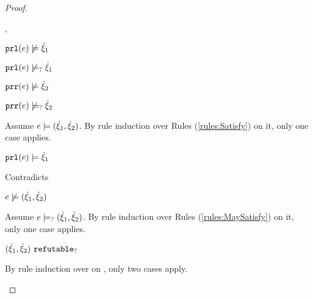 \begin{proof}
\begin{byCases}
\begin{byCases}
\begin{byCases}
        \item[\cnotsatisfyormay{\hprl{e}}{\hxi_1},\cnotsatisfyormay{\hprr{e}}{\hxi_2}]
            \begin{pfsteps*}
            \item $\mathtt{prl}(e) \not\models \dot{\xi}_1$  
            \item $\mathtt{prl}(e) \not\models_{?} \dot{\xi}_1$  
            \item $\mathtt{prr}(e) \not\models \dot{\xi}_2$  
            \item $\mathtt{prr}(e) \not\models_{?} \dot{\xi}_2$  
            \end{pfsteps*}
            Assume $e \models (\dot{\xi}_1 , \dot{\xi}_2)$. By rule induction over Rules (\ref{rules:Satisfy}) on it, only one case applies.
            \begin{byCases}
            \item[\text{(\ref{rule:CSNotIntroPair})}]
                \begin{pfsteps*}
                \item $\mathtt{prl}(e) \models \dot{\xi}_1$ 
                \end{pfsteps*}
                Contradicts 
            \end{byCases}
            \begin{pfsteps*}
            \item $e \not\models (\dot{\xi}_1 , \dot{\xi}_2)$  
            \end{pfsteps*}
            Assume $e \models_{?} (\dot{\xi}_1 , \dot{\xi}_2)$. By rule induction over Rules (\ref{rules:MaySatisfy}) on it, only one case applies.
            \begin{byCases}
            \item[\text{(\ref{rule:CMSNotIntro})}]
                \begin{pfsteps*}
                \item $(\dot{\xi}_1 , \dot{\xi}_2) ~\mathtt{refutable}_?$  
                \end{pfsteps*}
                By rule induction over  on , only two cases apply.
                \begin{byCases}

\end{byCases}
\end{byCases}
\end{byCases}
\end{byCases}
\end{byCases}
\end{proof}
